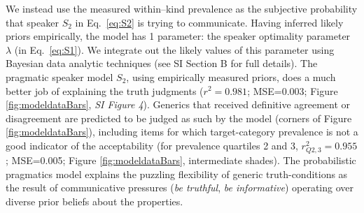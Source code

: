 \documentclass[10pt,letterpaper]{article}
\begin{document}
We instead use the measured within--kind prevalence as the subjective probability that speaker $S_2$ in Eq.~\ref{eq:S2} is trying to communicate.
Having inferred likely priors empirically, the model has 1 parameter: the speaker optimality parameter $\lambda$ (in Eq.~\ref{eq:S1}).
We integrate out the likely values of this parameter using Bayesian data analytic techniques \cite{LW2014} (see SI Section B for full details).
The pragmatic speaker model $S_2$, using empirically measured priors, does a much better job of explaining the truth judgments ($r^2=0.981$; MSE=0.003; Figure \ref{fig:modeldataBars}, {\it SI Figure 4}). 
Generics that received definitive agreement or disagreement are predicted to be judged as such by the model (corners of Figure \ref{fig:modeldataBars}), including items for which target-category prevalence is not a good indicator of the acceptability (for prevalence quartiles 2 and 3, $r_{Q2,3}^2=0.955$; MSE=0.005; Figure \ref{fig:modeldataBars}, intermediate shades).
The probabilistic pragmatics model explains the puzzling flexibility of generic truth-conditions as the result of communicative pressures (\emph{be truthful}, \emph{be informative}) operating over diverse prior beliefs about the properties. 
 




%
\end{document}
